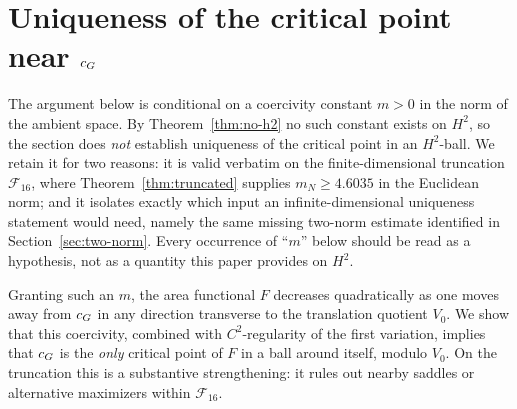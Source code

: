 %
%
%

\section{Uniqueness of the critical point near $c_{G}$}
\label{sec:uniqueness}

\begin{remark}\label{rem:uniqueness-scope}
The argument below is conditional on a coercivity constant $m > 0$ in
the norm of the ambient space.  By Theorem~\ref{thm:no-h2} no such
constant exists on $H^{2}$, so the section does \emph{not} establish
uniqueness of the critical point in an $H^{2}$-ball.  We retain it for
two reasons: it is valid verbatim on the finite-dimensional truncation
$\mathcal{F}_{16}$, where Theorem~\ref{thm:truncated} supplies
$m_{N}\geq 4.6035$ in the Euclidean norm; and it isolates exactly
which input an infinite-dimensional uniqueness statement would need,
namely the same missing two-norm estimate identified in
Section~\ref{sec:two-norm}.  Every occurrence of ``$m$'' below should
be read as a hypothesis, not as a quantity this paper provides on
$H^{2}$.
\end{remark}

Granting such an $m$, the area functional $F$
decreases quadratically as one moves away from $c_{G}$ in any direction
transverse to the translation quotient $V_{0}$.  We show
that this coercivity, combined with $C^{2}$-regularity of the
first variation, implies that $c_{G}$ is the \emph{only}
critical point of $F$ in a ball around itself, modulo
$V_{0}$.  On the truncation this is a substantive strengthening: it
rules out nearby saddles or alternative maximizers within
$\mathcal{F}_{16}$.

